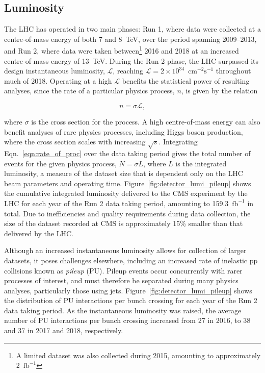 \subsection{Luminosity}

The LHC has operated in two main phases: Run 1, where data were collected at a centre-of-mass energy of both 7 and 8~TeV, over the period spanning 2009--2013, and Run 2, where data were taken between\footnote{A limited dataset was also collected during 2015, amounting to approximately 2~$\mathrm{fb}^{-1}$} 2016 and 2018 at an increased centre-of-mass energy of 13~TeV. During the Run 2 phase, the LHC surpassed its design instantaneous luminosity, $\mathcal{L}$, reaching $\mathcal{L}=2\times10^{34}$~$\mathrm{cm}^{-2}\mathrm{s}^{-1}$ throughout much of 2018. Operating at a high $\mathcal{L}$ benefits the statistical power of resulting analyses, since the rate of a particular physics process, $n$, is given by the relation

\begin{equation}
\label{eqn:rate_of_proc}
  n=\sigma\mathcal{L},     
\end{equation}

\noindent where $\sigma$ is the cross section for the process. A high centre-of-mass energy can also benefit analyses of rare physics processes, including Higgs boson production, where the cross section scales with increasing $\sqrt{s}$.
Integrating Eqn.~\ref{eqn:rate_of_proc} over the data taking period gives the total number of events for the given physics process, $N=\sigma L$, where $L$ is the integrated luminosity, a measure of the dataset size that is dependent only on the LHC beam parameters and operating time.
Figure~\ref{fig:detector_lumi_pileup} shows the cumulative integrated luminosity delivered to the CMS experiment by the LHC for each year of the Run 2 data taking period, amounting to 159.3~$\mathrm{fb}^{-1}$ in total.
Due to inefficiencies and quality requirements during data collection, the size of the dataset recorded at CMS is approximately 15\% smaller than that delivered by the LHC.

Although an increased instantaneous luminosity allows for collection of larger datasets, it poses challenges elsewhere, including an increased rate of inelastic pp collisions known as \textit{pileup} (PU). Pileup events occur concurrently with rarer processes of interest, and must therefore be separated during many physics analyses, particularly those using jets. Figure~\ref{fig:detector_lumi_pileup} shows the distribution of PU interactions per bunch crossing for each year of the Run 2 data taking period. As the instantaneous luminosity was raised, the average number of PU interactions per bunch crossing increased from 27 in 2016, to 38 and 37 in 2017 and 2018, respectively. 

